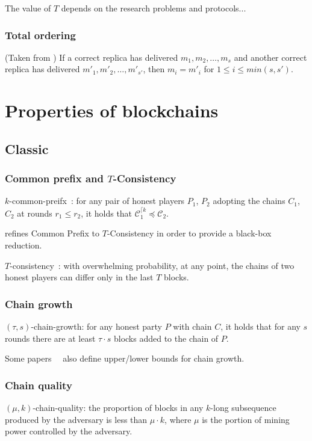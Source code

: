 \documentclass[runningheads]{llncs}
\begin{document}
The value of $T$ depends on the research problems and protocols...

\subsubsection{Total ordering}
(Taken from \cite{duan2018beat}) If a correct replica has delivered $m_1, m_2, \dots ,m_s$ and another correct replica has delivered $m'_1,m'_2, \dots,m'_{s'}$, then $m_i = m'_i$ for $1 \leq i \leq min(s, s')$.





\section{Properties of blockchains}

\subsection{Classic}

\subsubsection{Common prefix and $T$-Consistency}
$k$-common-preifx~\cite{garay2015bitcoin}:
for any pair of honest players $P_1$, $P_2$ adopting the chains $C_1$, $C_2$ at rounds $r_1 \leq r_2$, it holds that $\mathcal{C}_{1}^{\lceil k} \preceq \mathcal{C}_2$.

\cite{pass2017analysis} refines Common Prefix to $T$-Consistency in order to provide a black-box reduction.

$T$-consistency~\cite{pass2017analysis}:
with overwhelming probability, at any point, the chains of two honest players can differ only in the last $T$ blocks.

\subsubsection{Chain growth}
$(\tau, s)$-chain-growth:
for any honest party $P$ with chain $C$, it holds that for any $s$ rounds there are at least $\tau \cdot s$ blocks added to the chain of $P$.

Some papers~\cite{rocket2018snowflake}~\cite{pass2017sleepy} also define upper/lower bounds for chain growth.

\subsubsection{Chain quality}
$(\mu, k)$-chain-quality: the proportion of blocks in any $k$-long subsequence produced by the adversary is less than $\mu \cdot k$, where $\mu$ is the portion of mining power controlled by the adversary.






\end{document}
